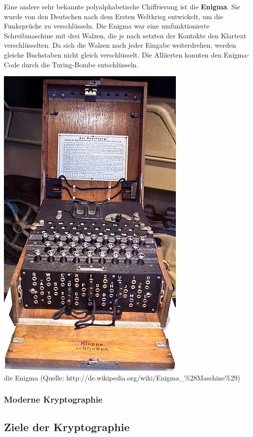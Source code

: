 \documentclass[12pt,a4paper]{report}
\begin{document}
Eine andere sehr bekannte polyalphabetische Chiffrierung ist die \textbf{Enigma}. Sie wurde von den Deutschen nach dem Ersten Weltkrieg entwickelt, um die Funksprüche zu verschlüsseln. Die Enigma war eine umfunktionierte Schreibmaschine mit drei Walzen, die je nach setzten der Kontakte den Klartext verschlüsselten. Da sich die Walzen nach jeder Eingabe weiterdrehen, werden gleiche Buchstaben nicht gleich verschlüsselt. Die Alliierten konnten den Enigma-Code durch die Turing-Bombe entschlüsseln.

\begin{center}
\includegraphics[scale=2.5]{img/enigma.jpg}\\
die Enigma (Quelle: http://de.wikipedia.org/wiki/Enigma\_\%28Maschine\%29)
\end{center}

\subsubsection{Moderne Kryptographie}

\subsection{Ziele der Kryptographie}
\end{document}
